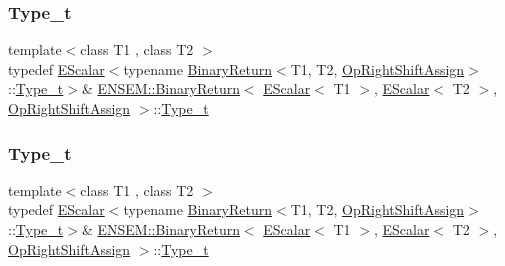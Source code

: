 \subsubsection{\texorpdfstring{Type\_t}{Type\_t}\hspace{0.1cm}{\footnotesize\ttfamily [2/3]}}
{\footnotesize\ttfamily template$<$class T1 , class T2 $>$ \\
typedef \mbox{\hyperlink{classENSEM_1_1EScalar}{E\+Scalar}}$<$typename \mbox{\hyperlink{structENSEM_1_1BinaryReturn}{Binary\+Return}}$<$T1, T2, \mbox{\hyperlink{structENSEM_1_1OpRightShiftAssign}{Op\+Right\+Shift\+Assign}}$>$\+::\mbox{\hyperlink{structENSEM_1_1BinaryReturn_3_01EScalar_3_01T1_01_4_00_01EScalar_3_01T2_01_4_00_01OpRightShiftAssign_01_4_a2b07316f5d115b01017222f13782ce26}{Type\+\_\+t}}$>$\& \mbox{\hyperlink{structENSEM_1_1BinaryReturn}{E\+N\+S\+E\+M\+::\+Binary\+Return}}$<$ \mbox{\hyperlink{classENSEM_1_1EScalar}{E\+Scalar}}$<$ T1 $>$, \mbox{\hyperlink{classENSEM_1_1EScalar}{E\+Scalar}}$<$ T2 $>$, \mbox{\hyperlink{structENSEM_1_1OpRightShiftAssign}{Op\+Right\+Shift\+Assign}} $>$\+::\mbox{\hyperlink{structENSEM_1_1BinaryReturn_3_01EScalar_3_01T1_01_4_00_01EScalar_3_01T2_01_4_00_01OpRightShiftAssign_01_4_a2b07316f5d115b01017222f13782ce26}{Type\+\_\+t}}}

\mbox{\label{structENSEM_1_1BinaryReturn_3_01EScalar_3_01T1_01_4_00_01EScalar_3_01T2_01_4_00_01OpRightShiftAssign_01_4_a2b07316f5d115b01017222f13782ce26}} 
\subsubsection{\texorpdfstring{Type\_t}{Type\_t}\hspace{0.1cm}{\footnotesize\ttfamily [3/3]}}
{\footnotesize\ttfamily template$<$class T1 , class T2 $>$ \\
typedef \mbox{\hyperlink{classENSEM_1_1EScalar}{E\+Scalar}}$<$typename \mbox{\hyperlink{structENSEM_1_1BinaryReturn}{Binary\+Return}}$<$T1, T2, \mbox{\hyperlink{structENSEM_1_1OpRightShiftAssign}{Op\+Right\+Shift\+Assign}}$>$\+::\mbox{\hyperlink{structENSEM_1_1BinaryReturn_3_01EScalar_3_01T1_01_4_00_01EScalar_3_01T2_01_4_00_01OpRightShiftAssign_01_4_a2b07316f5d115b01017222f13782ce26}{Type\+\_\+t}}$>$\& \mbox{\hyperlink{structENSEM_1_1BinaryReturn}{E\+N\+S\+E\+M\+::\+Binary\+Return}}$<$ \mbox{\hyperlink{classENSEM_1_1EScalar}{E\+Scalar}}$<$ T1 $>$, \mbox{\hyperlink{classENSEM_1_1EScalar}{E\+Scalar}}$<$ T2 $>$, \mbox{\hyperlink{structENSEM_1_1OpRightShiftAssign}{Op\+Right\+Shift\+Assign}} $>$\+::\mbox{\hyperlink{structENSEM_1_1BinaryReturn_3_01EScalar_3_01T1_01_4_00_01EScalar_3_01T2_01_4_00_01OpRightShiftAssign_01_4_a2b07316f5d115b01017222f13782ce26}{Type\+\_\+t}}}



